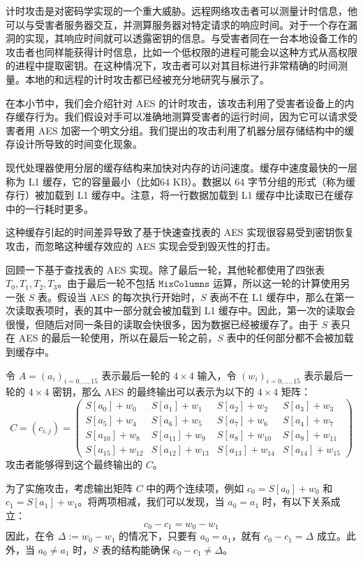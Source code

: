 计时攻击是对密码学实现的一个重大威胁。远程网络攻击者可以测量计时信息，他可以与受害者服务器交互，并测算服务器对特定请求的响应时间。对于一个存在漏洞的实现，其响应时间就可以透露密钥的信息。与受害者同在一台本地设备工作的攻击者也同样能获得计时信息，比如一个低权限的进程可能会以这种方式从高权限的进程中提取密钥。在这种情况下，攻击者可以对其目标进行非常精确的时间测量。本地的和远程的计时攻击都已经被充分地研究与展示了。

在本小节中，我们会介绍针对 AES 的计时攻击，该攻击利用了受害者设备上的内存缓存行为。我们假设对手可以准确地测算受害者的运行时间，因为它可以请求受害者用 AES 加密一个明文分组。我们提出的攻击利用了机器分层存储结构中的缓存设计所导致的时间变化现象。

现代处理器使用分层的缓存结构来加快对内存的访问速度。缓存中速度最快的一层称为 L1 缓存，它的容量最小（比如$64$ KB）。数据以 $64$ 字节分组的形式（称为缓存行）被加载到 L1 缓存中。注意，将一行数据加载到 L1 缓存中比读取已在缓存中的一行耗时更多。

这种缓存引起的时间差异导致了基于快速查找表的 AES 实现很容易受到密钥恢复攻击，而忽略这种缓存效应的 AES 实现会受到毁灭性的打击。

回顾一下基于查找表的 AES 实现。除了最后一轮，其他轮都使用了四张表 $T_0,T_1,T_2,T_3$。由于最后一轮不包括 $\mathtt{MixColumns}$ 运算，所以这一轮的计算使用另一张 $S$ 表。假设当 AES 的每次执行开始时，$S$ 表尚不在 L1 缓存中，那么在第一次读取表项时，表的其中一部分就会被加载到 L1 缓存中。因此，第一次的读取会很慢，但随后对同一条目的读取会快很多，因为数据已经被缓存了。由于 $S$ 表只在 AES 的最后一轮使用，所以在最后一轮之前，$S$ 表中的任何部分都不会被加载到缓存中。

令 $A=(a_i)_{i=0,\dots,15}$ 表示最后一轮的 $4\times4$ 输入，令 $(w_i)_{i=0,...,15}$ 表示最后一轮的 $4\times4$ 密钥，那么 AES 的最终输出可以表示为以下的 $4\times4$ 矩阵：
\begin{equation}\label{eq:4-19}
	C=(c_{i,j})=
	\begin{pmatrix}
		S[a_0]+w_0 & S[a_1]+w_1 & S[a_2]+w_2 & S[a_3]+w_3\\
		S[a_5]+w_4 & S[a_6]+w_5 & S[a_7]+w_6 & S[a_4]+w_7\\
		S[a_{10}]+w_8 & S[a_{11}]+w_9 & S[a_8]+w_{10} & S[a_9]+w_{11}\\
		S[a_{15}]+w_{12} & S[a_{12}]+w_{13} & S[a_{13}]+w_{14} & S[a_{14}]+w_{15}
	\end{pmatrix}
\end{equation}
攻击者能够得到这个最终输出的 $C$。

为了实施攻击，考虑输出矩阵 $C$ 中的两个连续项，例如 $c_0=S[a_0]+w_0$ 和 $c_1=S[a_1]+w_1$。将两项相减，我们可以发现，当 $a_0=a_1$ 时，有以下关系成立：
\[
c_0-c_1=w_0-w_1
\]
因此，在令 $\Delta:=w_0-w_1$ 的情况下，只要有 $a_0=a_1$，就有 $c_0-c_1=\Delta$ 成立。此外，当 $a_0\neq a_1$ 时，$S$ 表的结构能确保 $c_0-c_1\neq\Delta$。

